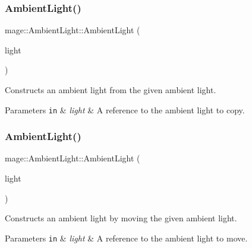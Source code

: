 \subsubsection{\texorpdfstring{Ambient\+Light()}{AmbientLight()}\hspace{0.1cm}{\footnotesize\ttfamily [2/3]}}
{\footnotesize\ttfamily mage\+::\+Ambient\+Light\+::\+Ambient\+Light (\begin{DoxyParamCaption}\item[{const \hyperlink{classmage_1_1_ambient_light}{Ambient\+Light} \&}]{light }\end{DoxyParamCaption})\hspace{0.3cm}{\ttfamily [default]}}

Constructs an ambient light from the given ambient light.


\begin{DoxyParams}[1]{Parameters}
\mbox{\tt in}  & {\em light} & A reference to the ambient light to copy. \\
\hline
\end{DoxyParams}
\hypertarget{classmage_1_1_ambient_light_aab4919587032054d28ec15cf5639ad48}{}\label{classmage_1_1_ambient_light_aab4919587032054d28ec15cf5639ad48} 
\subsubsection{\texorpdfstring{Ambient\+Light()}{AmbientLight()}\hspace{0.1cm}{\footnotesize\ttfamily [3/3]}}
{\footnotesize\ttfamily mage\+::\+Ambient\+Light\+::\+Ambient\+Light (\begin{DoxyParamCaption}\item[{\hyperlink{classmage_1_1_ambient_light}{Ambient\+Light} \&\&}]{light }\end{DoxyParamCaption})\hspace{0.3cm}{\ttfamily [default]}}

Constructs an ambient light by moving the given ambient light.


\begin{DoxyParams}[1]{Parameters}
\mbox{\tt in}  & {\em light} & A reference to the ambient light to move. \\
\hline
\end{DoxyParams}
\hypertarget{classmage_1_1_ambient_light_a511bb794b11f112e750da09f4044e7db}{}\label{classmage_1_1_ambient_light_a511bb794b11f112e750da09f4044e7db} 
